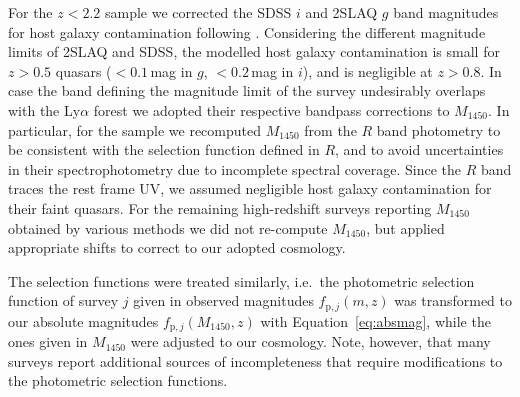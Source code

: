 \documentclass[fleqn,usenatbib]{mnras}
\begin{document}

For the $z<2.2$ sample we corrected the SDSS $i$ and 2SLAQ $g$ band
magnitudes for host galaxy contamination following
\citet{2009MNRAS.392...19C}. Considering the different magnitude
limits of 2SLAQ and SDSS, the modelled host galaxy contamination is
small for $z>0.5$ quasars ($<0.1$\,mag in $g$, $<0.2$\,mag in $i$),
and is negligible at $z>0.8$.  In case the band defining the magnitude
limit of the survey undesirably overlaps with the Ly$\alpha$ forest
\citep{2010ApJ...710.1498G, 2011ApJ...728L..26G, 2013ApJ...768..105M}
we adopted their respective bandpass corrections to $M_{1450}$. In
particular, for the \citet{2010ApJ...710.1498G, 2011ApJ...728L..26G}
sample we recomputed $M_{1450}$ from the $R$ band photometry to be
consistent with the selection function defined in $R$, and to avoid
uncertainties in their spectrophotometry due to incomplete spectral
coverage. Since the \citet{2010ApJ...710.1498G, 2011ApJ...728L..26G}
$R$ band traces the rest frame UV, we assumed negligible host galaxy
contamination for their faint quasars. For the remaining high-redshift
surveys reporting $M_{1450}$ obtained by various methods
\citep{2010AJ....139..906W, 2011Natur.474..616M, 2015ApJ...798...28K,
  2015ApJ...801L..11V, 2016ApJ...829...33Y, 2016ApJ...833..222J,
  2018Natur.553..473B} we did not re-compute $M_{1450}$, but applied
appropriate shifts to correct to our adopted cosmology.

The selection functions were treated similarly, i.e.\ the photometric
selection function of survey $j$ given in observed magnitudes
$f_{\mathrm{p},j}\left(m,z\right)$ \citep{2006AJ....131.2766R,
  2009MNRAS.392...19C, 2010ApJ...710.1498G, 2013ApJ...773...14R} was
transformed to our absolute magnitudes
$f_{\mathrm{p},j}\left(M_{1450},z\right)$ with
Equation~\ref{eq:absmag}, while the ones given in $M_{1450}$ were
adjusted to our cosmology. Note, however, that many surveys report
additional sources of incompleteness that require modifications to the
photometric selection functions.
\end{document}
